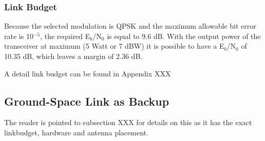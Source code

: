 \subsubsection{Link Budget}
Because the selected modulation is QPSK and the maximum allowable bit error rate is 10$^{-5}$, the required E$_{b}$/N$_{0}$ is equal to 9.6 dB. With the output power of the transceiver at maximum (5 Watt or 7 dBW) it is possible to have a E$_{b}$/N$_{0}$ of 10.35 dB, which leaves a margin of 2.36 dB.

A detail link budget can be found in Appendix XXX

\subsection{Ground-Space Link as Backup}
The reader is pointed to subsection XXX for details on this as it has the exact linkbudget, hardware and antenna placement. 

